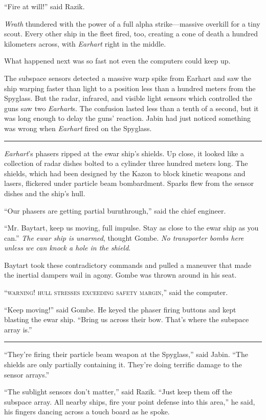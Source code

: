 \documentclass[twoside,letterpaper,12pt]{memoir}
\begin{document}
``Fire at will!'' said Razik.

\textit{Wrath} thundered with the power of a full alpha strike---massive overkill for a tiny scout. Every other ship in the fleet fired, too, creating a cone of death a hundred kilometers across, with \textit{Earhart} right in the middle.

What happened next was so fast not even the computers could keep up.

The subspace sensors detected a massive warp spike from Earhart and saw the ship warping faster than light to a position less than a hundred meters from the Spyglass. But the radar, infrared, and visible light sensors which controlled the guns saw two \textit{Earhart}s. The confusion lasted less than a tenth of a second, but it was long enough to delay the guns' reaction. Jabin had just noticed something was wrong when \textit{Earhart} fired on the Spyglass.

\fancybreak{\rule{3cm}{0.4 pt}}
\textit{Earhart}'s phasers ripped at the ewar ship's shields. Up close, it looked like a collection of radar dishes bolted to a cylinder three hundred meters long. The shields, which had been designed by the Kazon to block kinetic weapons and lasers, flickered under particle beam bombardment. Sparks flew from the sensor dishes and the ship's hull.

``Our phasers are getting partial burnthrough,'' said the chief engineer.

``Mr. Baytart, keep us moving, full impulse. Stay as close to the ewar ship as you can.'' \textit{The ewar ship is unarmed}, thought Gombe. \textit{No transporter bombs here unless we can knock a hole in the shield}.

Baytart took these contradictory commands and pulled a maneuver that made the inertial dampers wail in agony. Gombe was thrown around in his seat.

``\textsc{warning! hull stresses exceeding safety margin},'' said the computer.

``Keep moving!'' said Gombe. He keyed the phaser firing buttons and kept blasting the ewar ship. ``Bring us across their bow. That's where the subspace array is.''

\fancybreak{\rule{3cm}{0.4 pt}}
``They're firing their particle beam weapon at the Spyglass,'' said Jabin. ``The shields are only partially containing it. They're doing terrific damage to the sensor arrays.''

``The sublight sensors don't matter,'' said Razik. ``Just keep them off the subspace array. All nearby ships, fire your point defense into this area,'' he said, his fingers dancing across a touch board as he spoke.
\end{document}
